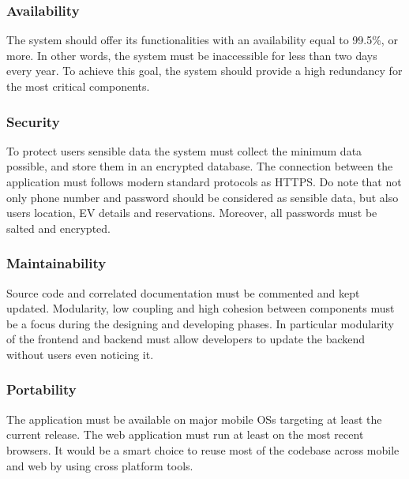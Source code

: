 \subsubsection{Availability}
The system should offer its functionalities with an availability
equal to 99.5\%, or more. In other words, the system must be inaccessible
for less than two days every year. To achieve this goal, the system should
provide a high redundancy for the most critical components.


\subsubsection{Security}
To protect users sensible data the system must collect the minimum data possible, and store them in an encrypted database.
The connection between the application must follows modern standard protocols as HTTPS. Do note that not only phone number and password should be considered as sensible data, but also users location, EV details and reservations.
Moreover, all passwords must be salted and encrypted.

\subsubsection{Maintainability}
Source code and correlated documentation must be commented and kept updated.
Modularity, low coupling and high cohesion between components must be a focus during the
designing and developing phases. In particular modularity of the frontend and backend must allow developers to update the backend without users even noticing it.

\subsubsection{Portability}
The application must be available on major mobile OSs targeting at least the current
release. The web application must run at least on the most recent
browsers. It would be a smart choice to reuse most of the codebase
across mobile and web by using cross platform tools.

